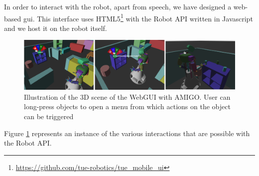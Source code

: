 \label{ssec:webgui}
In order to interact with the robot, apart from speech, we have designed a web-based \gls{gui}. This interface uses HTML5\footnote{\url{https://github.com/tue-robotics/tue_mobile_ui}} with the Robot API written in Javascript and we host it on the robot itself.

\begin{figure}[H]
	\includegraphics[width=\linewidth]{Figures/gui_actions}
	\caption{
		Illustration of the 3D scene of the WebGUI with AMIGO.
		User can long-press objects to open a menu from which actions on the object can be triggered
		}
	\label{fig:gui_actions}

\end{figure}
\noindent Figure \ref{fig:gui_actions} represents an instance of the various interactions that are possible with the Robot API.
